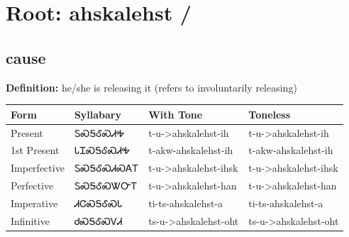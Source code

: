 \documentclass{article}%
\begin{document}
%
\normalsize%
\section*{Root: ahskalehst / }%
\subsection*{cause}%
\textbf{Definition: }%
he/she is releasing it (refers to involuntarily releasing)%
\\[0.5em]%
\begin{tabular}{|l|l|l|l|}%
\hline%
\textbf{Form}&\textbf{Syllabary}&\textbf{With Tone}&\textbf{Toneless}\\%
\hline%
Present&ᏚᏍᎦᎴᏍᏗᎭ&t{-}u{-}>ahskalehst{-}ih&t{-}u{-}>ahskalehst{-}ih\\%
1st Present&ᏓᏆᏍᎦᎴᏍᏗᎭ&t{-}akw{-}ahskalehst{-}ih&t{-}akw{-}ahskalehst{-}ih\\%
Imperfective&ᏚᏍᎦᎴᏍᏗᏍᎪᎢ&t{-}u{-}>ahskalehst{-}ihsk&t{-}u{-}>ahskalehst{-}ihsk\\%
Perfective&ᏚᏍᎦᎴᏍᏔᏅᎢ&t{-}u{-}>ahskalehst{-}han&t{-}u{-}>ahskalehst{-}han\\%
Imperative&ᏗᏣᏍᎦᎴᏍᏓ&ti{-}ts{-}ahskalehst{-}a&ti{-}ts{-}ahskalehst{-}a\\%
Infinitive&ᏧᏍᎦᎴᏍᏙᏗ&ts{-}u{-}>ahskalehst{-}oht&ts{-}u{-}>ahskalehst{-}oht\\%
\hline%
\end{tabular}%
\\[1em]%
\end{document}
